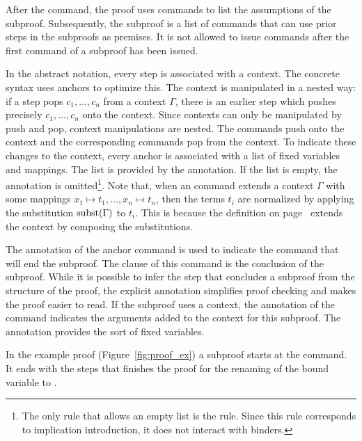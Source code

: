 \documentclass{scrartcl}
\begin{document}
After the  command, the proof uses
 commands to list the assumptions of the subproof.
Subsequently, the subproof is a list of  commands
that can use prior steps in the subproofs as premises.  It is not allowed
to issue  commands after the first 
command of a subproof has been issued.

In the abstract notation, every step is associated with a context.  The
concrete syntax uses anchors to optimize this.
The context is manipulated in a nested way: if a step
pops $c_1,\dots, c_n$ from a context $\Gamma$, there is an earlier step which
pushes precisely $c_1,\dots, c_n$ onto the context.
%
Since contexts can only be manipulated by push and pop, context manipulations
are nested.  The  commands push onto the context and the
corresponding  commands pop from the context.
%
To indicate these changes to the context, every anchor is associated with a list
of fixed variables and mappings.  The list is provided by the 
annotation.  If the list is empty, the  annotation is
omitted\footnote{The only rule that allows an empty list is the
 rule.  Since this rule corresponds to implication introduction,
it does not interact with binders.}.
%
Note that, when an  command extends a context $\Gamma$ with
some mappings $x_1 \mapsto t_1, \dots,  x_n \mapsto t_n$,
then the terms $t_i$ are normalized by applying
the substitution $\operatorname*{subst}(\Gamma)$ to $t_i$.  This is because the definition
on page~\pageref{page:ctxdef} extends the context by composing the substitutions.

The  annotation of the anchor command is used to indicate
the  command that will end the subproof.  The clause of
this  command is the conclusion of the subproof.
While it is possible to infer the
step that concludes a subproof from the structure of the proof, the explicit
annotation simplifies proof checking and makes the proof easier to read.
If the subproof uses a
context, the  annotation of the  command
indicates the arguments added to the context for this subproof.  The
annotation provides the sort of fixed variables.

In the example proof (Figure~\ref{fig:proof_ex}) a
subproof starts at the  command.
It ends with the  steps that finishes the
proof for the renaming of the bound variable 
to .
\end{document}
